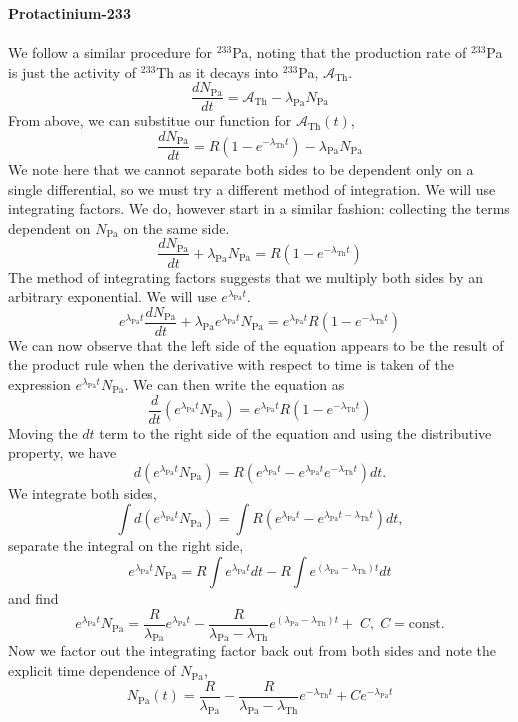 \documentclass{report}
\begin{document}
\begin{enumerate}[a)]
\textbf{Protactinium-233}\\
\-\\
We follow a similar procedure for $^{233}$Pa, noting that the production rate of $^{233}$Pa is just the activity of $^{233}$Th as it decays into $^{233}$Pa, $\mathcal{A}_{\text{Th}}$.
$$\frac{dN_{\text{Pa}}}{dt} = \mathcal{A}_{\text{Th}} - \lambda_{\text{Pa}}N_{\text{Pa}}$$
From above, we can substitue our function for $\mathcal{A}_{\text{Th}}(t)$,
$$\frac{dN_{\text{Pa}}}{dt} = R(1-e^{-\lambda_{\text{Th}}t}) - \lambda_{\text{Pa}}N_{\text{Pa}}$$
We note here that we cannot separate both sides to be dependent only on a single differential, so we must try a different method of integration. We will use integrating factors. We do, however start in a similar fashion: collecting the terms dependent on $N_{\text{Pa}}$ on the same side.
$$ \frac{dN_{\text{Pa}}}{dt}+\lambda_{\text{Pa}}N_{\text{Pa}} = R(1-e^{-\lambda_{\text{Th}}t}) $$
The method of integrating factors suggests that we multiply both sides by an arbitrary exponential. We will use $e^{\lambda_{\text{Pa}}t}$.
$$ e^{\lambda_{\text{Pa}}t}\frac{dN_{\text{Pa}}}{dt} + \lambda_{\text{Pa}}e^{\lambda_{\text{Pa}}t}N_{\text{Pa}} = e^{\lambda_{\text{Pa}}t}R(1-e^{-\lambda_{\text{Th}}t}) $$
We can now observe that the left side of the equation appears to be the result of the product rule when the derivative with respect to time is taken of the expression $e^{\lambda_{\text{Pa}}t}N_{\text{Pa}}$. We can then write the equation as
$$\frac{d}{dt}(e^{\lambda_{\text{Pa}}t}N_{\text{Pa}}) = e^{\lambda_{\text{Pa}}t}R(1-e^{-\lambda_{\text{Th}}t})$$
Moving the $dt$ term to the right side of the equation and using the distributive property, we have
$$ d(e^{\lambda_{\text{Pa}}t}N_{\text{Pa}}) = R(e^{\lambda_{\text{Pa}}t}-e^{\lambda_{\text{Pa}}t}e^{-\lambda_{\text{Th}}t})dt .$$
We integrate both sides,
$$ \int{d(e^{\lambda_{\text{Pa}}t}N_{\text{Pa}})} = \int{ R(e^{\lambda_{\text{Pa}}t}-e^{\lambda_{\text{Pa}}t-\lambda_{\text{Th}}t})dt}, $$
separate the integral on the right side,
$$ e^{\lambda_{\text{Pa}}t}N_{\text{Pa}} = R\int{ e^{\lambda_{\text{Pa}}t}dt}-R\int{e^{(\lambda_{\text{Pa}}-\lambda_{\text{Th}})t}dt} $$
and find
$$e^{\lambda_{\text{Pa}}t}N_{\text{Pa}} = \frac{R}{\lambda_{\text{Pa}}}e^{\lambda_{\text{Pa}}t}-\frac{R}{\lambda_{\text{Pa}}-\lambda_{\text{Th}}}e^{(\lambda_{\text{Pa}}-\lambda_{\text{Th}})t} +\;C,\; C=\text{const.}$$
Now we factor out the integrating factor back out from both sides and note the explicit time dependence of $N_{\text{Pa}}$,
$$N_{\text{Pa}}(t) = \frac{R}{\lambda_{\text{Pa}}}-\frac{R}{\lambda_{\text{Pa}}-\lambda_{\text{Th}}}e^{-\lambda_{\text{Th}}t}+Ce^{-\lambda_{\text{Pa}}t}$$

\end{enumerate}
\end{document}
